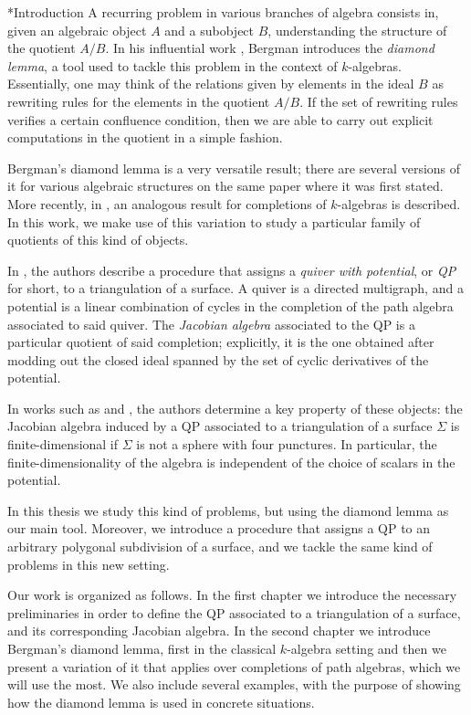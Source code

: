 \begin{chapter}*{Introduction}
A recurring problem in various branches of algebra consists in, given an algebraic object $A$ and a subobject $B$, understanding the structure of the quotient $A/B$. In his influential work \cite{Ber78}, Bergman introduces the \emph{diamond lemma}, a tool used to tackle this problem in the context of $k$-algebras. Essentially, one may think of the relations given by elements in the ideal $B$ as rewriting rules for the elements in the quotient $A/B$. If the set of rewriting rules verifies a certain confluence condition, then we are able to carry out explicit computations in the quotient in a simple fashion.

Bergman's diamond lemma is a very versatile result; there are several versions of it for various algebraic structures on the same paper where it was first stated. More recently, in \cite{SAV15}, an analogous result for completions of $k$-algebras is described. In this work, we make use of this variation to study a particular family of quotients of this kind of objects.

In \cite{DWZ08}, the authors describe a procedure that assigns a \emph{quiver with potential}, or \emph{QP} for short, to a triangulation of a surface. A quiver is a directed multigraph, and a potential is a linear combination of cycles in the completion of the path algebra associated to said quiver. The \emph{Jacobian algebra} associated to the QP is a particular quotient of said completion; explicitly, it is the one obtained after modding out the closed ideal spanned by the set of cyclic derivatives of the potential.

In works such as \cite{Lad12} and \cite{TVD12}, the authors determine a key property of these objects: the Jacobian algebra induced by a QP associated to a triangulation of a surface $\Sigma$ is finite-dimensional if $\Sigma$ is not a sphere with four punctures. In particular, the finite-dimensionality of the algebra is independent of the choice of scalars in the potential. 

In this thesis we study this kind of problems, but using the diamond lemma as our main tool. Moreover, we introduce a procedure that assigns a QP to an arbitrary polygonal subdivision of a surface, and we tackle the same kind of problems in this new setting.

Our work is organized as follows. In the first chapter we introduce the necessary preliminaries in order to define the QP associated to a triangulation of a surface, and its corresponding Jacobian algebra. In the second chapter we introduce Bergman's diamond lemma, first in the classical $k$-algebra setting and then we present a variation of it that applies over completions of path algebras, which we will use the most. We also include several examples, with the purpose of showing how the diamond lemma is used in concrete situations.


\end{chapter}
